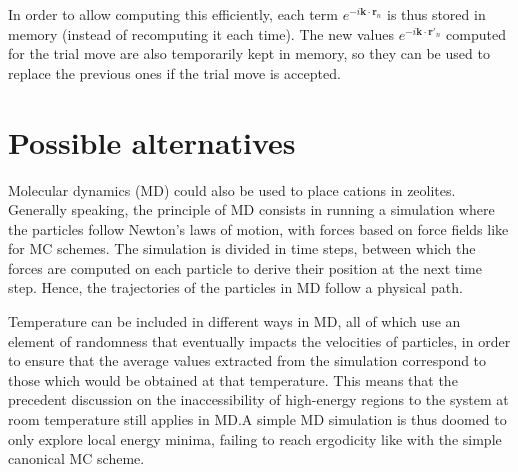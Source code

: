 \documentclass[main.tex]{subfiles}
\begin{document}
In order to allow computing this efficiently, each term $e^{-i\boldsymbol k\cdot\boldsymbol r_n}$ is thus stored in memory (instead of recomputing it each time). The new values $e^{-i\boldsymbol k\cdot\boldsymbol{r'}_n}$ computed for the trial move are also temporarily kept in memory, so they can be used to replace the previous ones if the trial move is accepted.



\section{Possible alternatives}

Molecular dynamics (MD) could also be used to place cations in zeolites. Generally speaking, the principle of MD consists in running a simulation where the particles follow Newton's laws of motion, with forces based on force fields like for MC schemes. The simulation is divided in time steps, between which the forces are computed on each particle to derive their position at the next time step. Hence, the trajectories of the particles in MD follow a physical path.

Temperature can be included in different ways in MD, all of which use an element of randomness that eventually impacts the velocities of particles, in order to ensure that the average values extracted from the simulation correspond to those which would be obtained at that temperature. This means that the precedent discussion on the inaccessibility of high-energy regions to the system at room temperature still applies in MD.\@ A simple MD simulation is thus doomed to only explore local energy minima, failing to reach ergodicity like with the simple canonical MC scheme.
\end{document}
